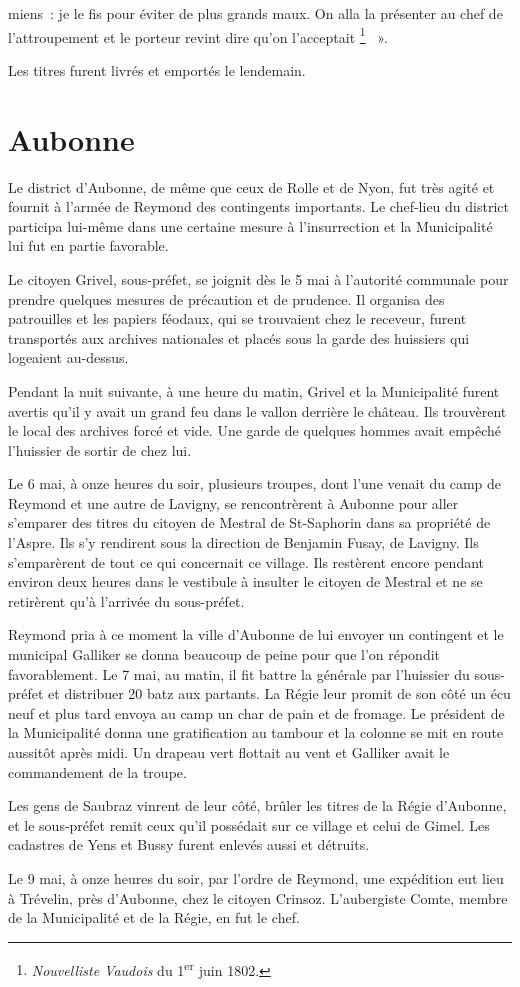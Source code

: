 \documentclass[french,twoside]{book} %
\newenvironment{quoteblock}%
  {\begin{quoting}}
  {\end{quoting}}
\newenvironment{quotebar}{%
    \def\FrameCommand{{\color{rubric!10!}\vrule width 0.5em} \hspace{0.9em}}%
    \def\OuterFrameSep{\itemsep} %
    \MakeFramed {\advance\hsize-\width \FrameRestore}
  }%
  {%
    \endMakeFramed
  }
\renewenvironment{quoteblock}%
  {%
    \savenotes
    \setstretch{0.9}
    \normalfont
    \begin{quotebar}
  }
  {%
    \end{quotebar}
    \spewnotes
  }
\begin{document}
\begin{quoteblock}
miens : je le fis pour éviter de plus grands maux. On alla la présenter au chef de l’attroupement et le porteur revint dire qu’on l’acceptait \footnote{\emph{Nouvelliste Vaudois} du 1\textsuperscript{er} juin 1802.}  ».
 \end{quoteblock}

\noindent Les titres furent livrés et emportés le lendemain.
\section[{Aubonne}]{Aubonne}
\noindent Le district d’Aubonne, de même que ceux de Rolle et de Nyon, fut très agité et fournit à l’armée de Reymond des contingents importants. Le chef-lieu du district participa lui-même dans une certaine mesure à l’insurrection et la Municipalité lui fut en partie favorable.\par
Le citoyen Grivel, sous-préfet, se joignit dès le 5 mai à l’autorité communale pour prendre quelques mesures de précaution et de prudence. Il organisa des patrouilles et les papiers féodaux, qui se trouvaient chez le receveur, furent transportés aux archives nationales et placés sous la garde des huissiers qui logeaient au-dessus.\par
Pendant la nuit suivante, à une heure du matin, Grivel et la Municipalité furent avertis qu’il y avait un grand feu dans le vallon derrière le château. Ils trouvèrent le local des archives forcé et vide. Une garde de quelques hommes avait empêché l’huissier de sortir de chez lui.\par
Le 6 mai, à onze heures du soir, plusieurs troupes, dont l’une venait du camp de Reymond et une autre de Lavigny, se rencontrèrent à Aubonne pour aller s’emparer des titres du citoyen de Mestral de St-Saphorin dans sa propriété de l’Aspre. Ils s’y rendirent sous la direction de Benjamin Fusay, de Lavigny. Ils s’emparèrent de tout ce qui concernait ce village. Ils restèrent encore pendant environ deux heures dans le vestibule à insulter le citoyen de Mestral et ne se retirèrent qu’à l’arrivée du sous-préfet.\par
Reymond pria à ce moment la ville d’Aubonne de lui envoyer un contingent et le municipal Galliker se donna beaucoup de peine pour que l’on répondit favorablement. Le 7 mai, au matin, il fit battre la générale par l’huissier du sous-préfet et distribuer 20 batz aux partants. La Régie leur promit de son côté un écu neuf et plus tard envoya au camp un char de pain et de fromage. Le président de la Municipalité donna une gratification au tambour et la colonne se mit en route aussitôt après midi. Un drapeau vert flottait au vent et Galliker avait le commandement de la troupe.\par
Les gens de Saubraz vinrent de leur côté, brûler les titres de la Régie d’Aubonne, et le sous-préfet remit ceux qu’il possédait sur ce village et celui de Gimel. Les cadastres de Yens et Bussy furent enlevés aussi et détruits.\par
Le 9 mai, à onze heures du soir, par l’ordre de Reymond, une expédition eut lieu à Trévelin, près d’Aubonne, chez le citoyen Crinsoz. L’aubergiste Comte, membre de la Municipalité et de la Régie, en fut le chef.\par
\end{document}
